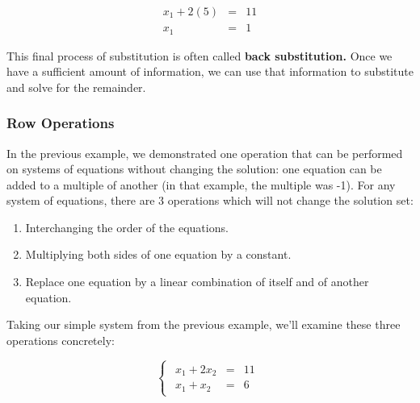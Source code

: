 \documentclass[
]{article}
\providecommand{\tightlist}{%
  \setlength{\itemsep}{0pt}\setlength{\parskip}{0pt}}
\theoremstyle{definition}
\theoremstyle{definition}
\theoremstyle{definition}
\theoremstyle{definition}
\theoremstyle{remark}
\begin{document}
\[\begin{eqnarray}
x_1+2(5)&=&11 \\
x_1 &=& 1
\end{eqnarray}\]

This final process of substitution is often called \textbf{back substitution.} Once we have a sufficient amount of information, we can use that information to substitute and solve for the remainder.

\hypertarget{row-operations}{%
\subsubsection{Row Operations}\label{row-operations}}

In the previous example, we demonstrated one operation that can be performed on systems of equations without changing the solution: one equation can be added to a multiple of another (in that example, the multiple was -1). For any system of equations, there are 3 operations which will not change the solution set:

\begin{enumerate}
\def\labelenumi{\arabic{enumi}.}
\tightlist
\item
  Interchanging the order of the equations.
\item
  Multiplying both sides of one equation by a constant.
\item
  Replace one equation by a linear combination of itself and of another equation.
\end{enumerate}

Taking our simple system from the previous example, we'll examine these three operations concretely:

\[\begin{cases}\begin{eqnarray}
x_1+2x_2 &=& 11\\
x_1+x_2 &=& 6\end{eqnarray}\end{cases}\]
\end{document}
